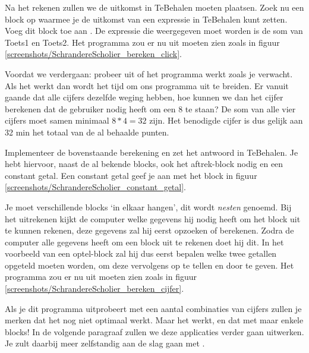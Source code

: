 \begin{opgave}
    \opgVraag
Na het rekenen zullen we de uitkomst in TeBehalen moeten plaatsen. Zoek nu een block op waarmee je de uitkomst van een expressie in TeBehalen kunt zetten. Voeg dit block toe aan . De expressie die weergegeven moet worden is de som van Toets1 en Toets2. 
    \opgUitwerking
    Het programma zou er nu uit moeten zien zoals in figuur \ref{screenshots/SchrandereScholier_bereken_click}.
\end{opgave}

\runOpTelefoon{} Voordat we verdergaan: probeer uit of het programma werkt zoals je verwacht. Als het werkt dan wordt het tijd om ons programma uit te breiden. Er vanuit gaande dat alle cijfers dezelfde weging hebben, hoe kunnen we dan het cijfer berekenen dat de gebruiker nodig heeft om een 8 te staan? De som van alle vier cijfers moet samen minimaal $8*4=32$ zijn. Het benodigde cijfer is dus gelijk aan 32 min het totaal van de al behaalde punten.
 
 \begin{opgave}
    \opgVraag
Implementeer de bovenstaande berekening en zet het antwoord in TeBehalen. Je hebt hiervoor, naast de al bekende blocks, ook het aftrek-block nodig en een constant getal. Een constant getal geef je aan met het block in figuur  \ref{screenshots/SchrandereScholier_constant_getal}. 

Je moet verschillende blocks `in elkaar hangen', dit wordt \emph{nesten} genoemd. Bij het uitrekenen kijkt de computer welke gegevens hij nodig heeft om het block uit te kunnen rekenen, deze gegevens zal hij eerst opzoeken of berekenen. Zodra de computer alle gegevens heeft om een block uit te rekenen doet hij dit. In het voorbeeld van een optel-block zal hij dus eerst bepalen welke twee getallen opgeteld moeten worden, om deze vervolgens op te tellen en door te geven.
    \opgUitwerking
    Het programma zou er nu uit moeten zien zoals in figuur \ref{screenshots/SchrandereScholier_bereken_cijfer}.
\end{opgave}

\runOpTelefoon{}
Als je dit programma uitprobeert met een aantal combinaties van cijfers zullen je merken dat het nog niet optimaal werkt. Maar het werkt, en dat met maar enkele blocks! In de volgende paragraaf zullen we deze applicaties verder gaan uitwerken. Je zult daarbij meer zelfstandig aan de slag gaan met \ai.

